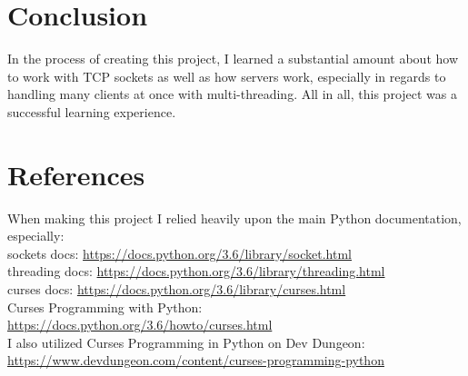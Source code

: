 \documentclass{article}
\begin{document}
    \section{Conclusion}
    In the process of creating this project, I learned a substantial amount
    about how to work with TCP sockets as well as how servers work, especially
    in regards to handling many clients at once with multi-threading. All in
    all, this project was a successful learning experience.

    \section{References}
    When making this project I relied heavily upon the main Python
    documentation, especially:\\
    sockets docs: \url{https://docs.python.org/3.6/library/socket.html}\\
    threading docs: \url{https://docs.python.org/3.6/library/threading.html}\\
    curses docs: \url{https://docs.python.org/3.6/library/curses.html}\\
    Curses Programming with Python:
    \url{https://docs.python.org/3.6/howto/curses.html}\\
    I also utilized Curses Programming in Python on Dev Dungeon:
    \url{https://www.devdungeon.com/content/curses-programming-python}\\
\end{document}
